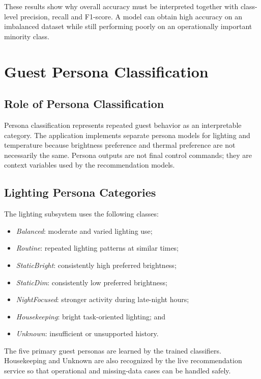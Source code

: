 These results show why overall accuracy must be interpreted together with
class-level precision, recall and F1-score. A model can obtain high accuracy
on an imbalanced dataset while still performing poorly on an operationally
important minority class.


\chapter{Guest Persona Classification}
\label{chap:persona-classification}

\section{Role of Persona Classification}

Persona classification represents repeated guest behavior as an interpretable
category. The application implements separate persona models for lighting and
temperature because brightness preference and thermal preference are not
necessarily the same. Persona outputs are not final control commands; they are
context variables used by the recommendation models.

\section{Lighting Persona Categories}

The lighting subsystem uses the following classes:

\begin{itemize}
    \item \textit{Balanced}: moderate and varied lighting use;
    \item \textit{Routine}: repeated lighting patterns at similar times;
    \item \textit{StaticBright}: consistently high preferred brightness;
    \item \textit{StaticDim}: consistently low preferred brightness;
    \item \textit{NightFocused}: stronger activity during late-night hours;
    \item \textit{Housekeeping}: bright task-oriented lighting; and
    \item \textit{Unknown}: insufficient or unsupported history.
\end{itemize}

The five primary guest personas are learned by the trained classifiers.
Housekeeping and Unknown are also recognized by the live recommendation
service so that operational and missing-data cases can be handled safely.

